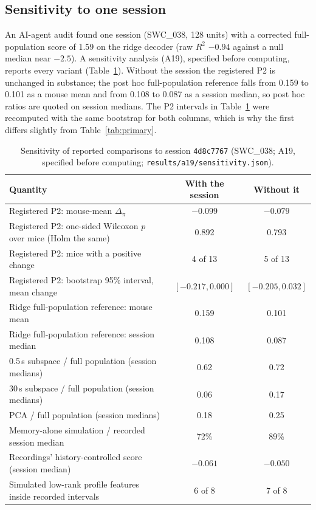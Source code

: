 \documentclass{article}
\begin{document}
\subsection{Sensitivity to one session}
\label{app:a19}

An AI-agent audit found one session (SWC\_038, 128 units) with a corrected full-population score of 1.59 on the ridge
decoder (raw $R^2$ $-0.94$ against a null median near $-2.5$). A sensitivity analysis (A19), specified before
computing, reports every variant (Table~\ref{tab:a19}). Without the session the registered P2 is unchanged in
substance; the post hoc full-population reference falls from 0.159 to 0.101 as a mouse mean and from 0.108 to 0.087 as
a session median, so post hoc ratios are quoted on session medians. The P2 intervals in Table~\ref{tab:a19} were
recomputed with the same bootstrap for both columns, which is why the first differs slightly from
Table~\ref{tab:primary}.

\begin{table}[H]
  \caption{Sensitivity of reported comparisons to session \texttt{4d8c7767} (SWC\_038; A19, specified before
  computing; \texttt{results/a19/sensitivity.json}).}
  \label{tab:a19}
  \centering\small
  \begin{tabular}{lcc}
    \toprule
    Quantity & With the session & Without it \\
    \midrule
    Registered P2: mouse-mean $\Delta_\pi$ & $-0.099$ & $-0.079$ \\
    Registered P2: one-sided Wilcoxon $p$ over mice (Holm the same) & 0.892 & 0.793 \\
    Registered P2: mice with a positive change & 4 of 13 & 5 of 13 \\
    Registered P2: bootstrap 95\% interval, mean change & $[-0.217, 0.000]$ & $[-0.205, 0.032]$ \\
    Ridge full-population reference: mouse mean & 0.159 & 0.101 \\
    Ridge full-population reference: session median & 0.108 & 0.087 \\
    0.5\,s subspace / full population (session medians) & 0.62 & 0.72 \\
    30\,s subspace / full population (session medians) & 0.06 & 0.17 \\
    PCA / full population (session medians) & 0.18 & 0.25 \\
    Memory-alone simulation / recorded session median & 72\% & 89\% \\
    Recordings' history-controlled score (session median) & $-0.061$ & $-0.050$ \\
    Simulated low-rank profile features inside recorded intervals & 6 of 8 & 7 of 8 \\
    \bottomrule
  \end{tabular}
\end{table}
\end{document}
